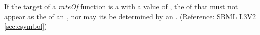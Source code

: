 If the target of a \emph{rateOf}  function is a \Species with a  value of , the  of that \Species must not appear as the  of an \AssignmentRule, nor may its  be determined by an \AlgebraicRule.  (Reference: SBML L3V2 \ref{sec:csymbol})

